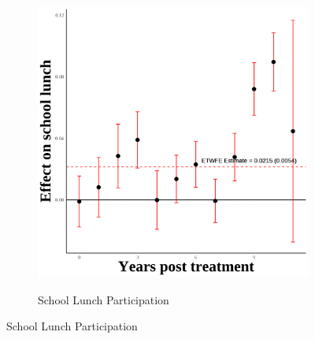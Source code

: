 \documentclass[12pt,english]{article}
\begin{document}
\begin{figure}[H]
\begin{subfigure}[b]{0.3\textwidth}
    \label{fig:ln-schl-lunch-fourth}
  \end{subfigure}
  \hfill
  \begin{subfigure}[b]{0.3\textwidth}
    \centering
    \caption{School Lunch Participation}
    \includegraphics[width=\linewidth]{figures/plot91-schl_lunch_event_study-fourth.png}
    \label{fig:schl-lunch-fourth}
  \end{subfigure}

  \vspace{0.3cm} %


\end{figure}
\end{document}
